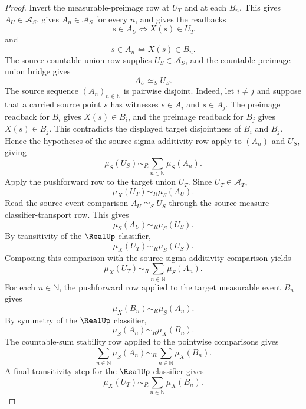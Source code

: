 \begin{proof}
Invert the measurable-preimage row at $U_T$ and at each $B_n$. This gives $A_U\in\mathcal{A}_S$, gives $A_n\in\mathcal{A}_S$ for every $n$, and gives the readbacks
$$
s\in A_U\Longleftrightarrow X(s)\in U_T
$$
and
$$
s\in A_n\Longleftrightarrow X(s)\in B_n.
$$
The source countable-union row supplies $U_S\in\mathcal{A}_S$, and the countable preimage-union bridge gives
$$
A_U\simeq_S U_S.
$$
The source sequence $(A_n)_{n\in\mathbb N}$ is pairwise disjoint. Indeed, let $i\neq j$ and suppose that a carried source point $s$ has witnesses $s\in A_i$ and $s\in A_j$. The preimage readback for $B_i$ gives $X(s)\in B_i$, and the preimage readback for $B_j$ gives $X(s)\in B_j$. This contradicts the displayed target disjointness of $B_i$ and $B_j$.
Hence the hypotheses of the source sigma-additivity row apply to $(A_n)$ and $U_S$, giving
$$
\mu_S(U_S)\sim_R\sum_{n\in\mathbb N}\mu_S(A_n).
$$
Apply the pushforward row to the target union $U_T$. Since $U_T\in\mathcal{A}_T$,
$$
\mu_X(U_T)\sim_R\mu_S(A_U).
$$
Read the source event comparison $A_U\simeq_S U_S$ through the source measure classifier-transport row. This gives
$$
\mu_S(A_U)\sim_R\mu_S(U_S).
$$
By transitivity of the $\RealUp$ classifier,
$$
\mu_X(U_T)\sim_R\mu_S(U_S).
$$
Composing this comparison with the source sigma-additivity comparison yields
$$
\mu_X(U_T)\sim_R\sum_{n\in\mathbb N}\mu_S(A_n).
$$
For each $n\in\mathbb N$, the pushforward row applied to the target measurable event $B_n$ gives
$$
\mu_X(B_n)\sim_R\mu_S(A_n).
$$
By symmetry of the $\RealUp$ classifier,
$$
\mu_S(A_n)\sim_R\mu_X(B_n).
$$
The countable-sum stability row applied to the pointwise comparisons gives
$$
\sum_{n\in\mathbb N}\mu_S(A_n)\sim_R\sum_{n\in\mathbb N}\mu_X(B_n).
$$
A final transitivity step for the $\RealUp$ classifier gives
$$
\mu_X(U_T)\sim_R\sum_{n\in\mathbb N}\mu_X(B_n).
$$
\end{proof}

